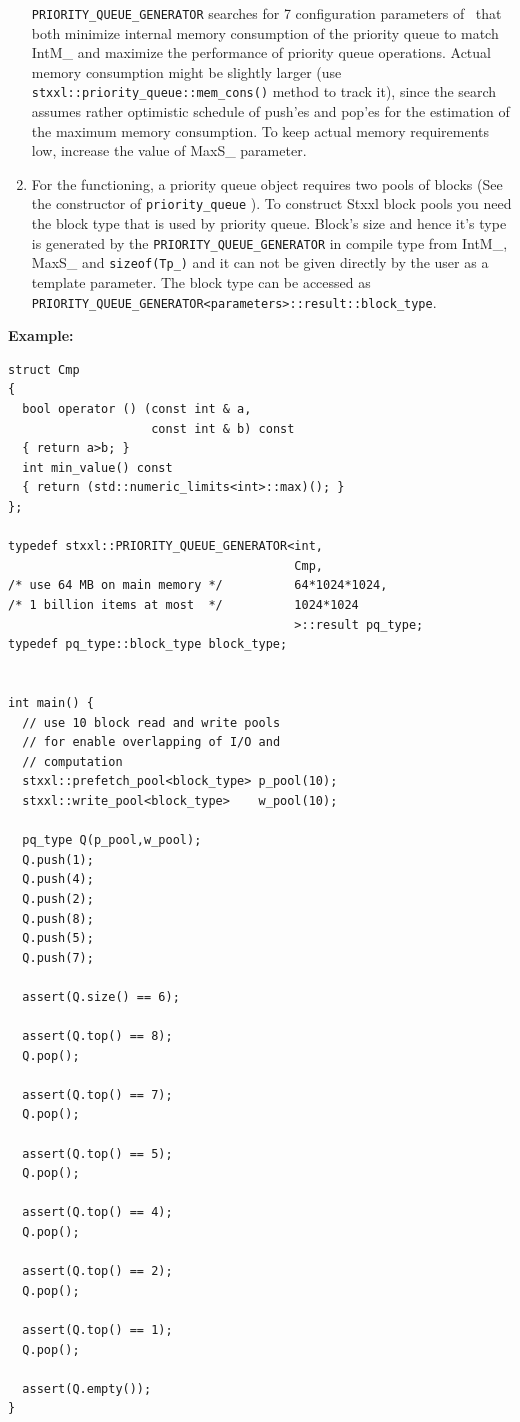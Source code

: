\documentclass[twoside]{book}
\newcommand{\stxxl}{{\sc Stxxl} }
\begin{document}
\begin{enumerate}
\texttt{PRIORITY\_QUEUE\_GENERATOR} searches for 7 
configuration parameters of \xpqueue\ that both minimize
internal memory consumption of the priority queue to match IntM\_ and
maximize the performance of priority queue operations. Actual memory
consumption might be slightly larger (use
\texttt{stxxl::priority\_queue::mem\_cons()}
method to track it), since the search assumes rather optimistic
schedule of push'es and pop'es for the estimation of the maximum
memory consumption. To keep actual memory requirements low, increase
the value of MaxS\_ parameter. 
\item 
For the functioning, a priority queue object requires two pools of blocks
(See the constructor of \texttt{priority\_queue} ). To construct
\stxxl block pools 
you need the block type that is used by priority queue. Block's size
and hence it's type is generated by the 
\texttt{PRIORITY\_QUEUE\_GENERATOR} in compile type from IntM\_, MaxS\_
and \texttt{sizeof(Tp\_)} and it can not be given directly by the user
as a template parameter. The block type can be accessed as\\
\texttt{PRIORITY\_QUEUE\_GENERATOR<parameters>::result::block\_type}. 

\end{enumerate}

{\bf Example:}
\begin{lstlisting}
struct Cmp
{
  bool operator () (const int & a, 
                    const int & b) const 
  { return a>b; }
  int min_value() const  
  { return (std::numeric_limits<int>::max)(); }
};

typedef stxxl::PRIORITY_QUEUE_GENERATOR<int,
                                        Cmp,
/* use 64 MB on main memory */          64*1024*1024,
/* 1 billion items at most  */          1024*1024
                                        >::result pq_type;
typedef pq_type::block_type block_type;


int main() {
  // use 10 block read and write pools 
  // for enable overlapping of I/O and
  // computation
  stxxl::prefetch_pool<block_type> p_pool(10);
  stxxl::write_pool<block_type>    w_pool(10);

  pq_type Q(p_pool,w_pool);
  Q.push(1);
  Q.push(4);
  Q.push(2);
  Q.push(8);
  Q.push(5);
  Q.push(7);
  
  assert(Q.size() == 6);

  assert(Q.top() == 8);
  Q.pop();

  assert(Q.top() == 7);
  Q.pop();

  assert(Q.top() == 5);
  Q.pop();

  assert(Q.top() == 4);
  Q.pop();

  assert(Q.top() == 2);
  Q.pop();

  assert(Q.top() == 1);
  Q.pop();

  assert(Q.empty());
}


\end{lstlisting}
\end{document}
